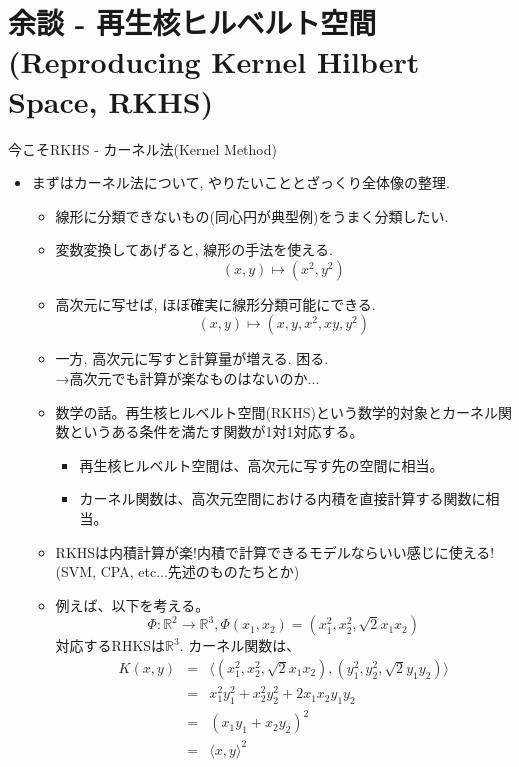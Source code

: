 \documentclass[dvipdfmx,8pt]{beamer}
\begin{document}
  \section{余談 - 再生核ヒルベルト空間\\(Reproducing Kernel Hilbert Space, RKHS)}
  \begin{frame}{今こそRKHS - カーネル法(Kernel Method)}
    \begin{itemize}
      \item まずはカーネル法について, やりたいこととざっくり全体像の整理. \\
        \begin{itemize}
          \item 線形に分類できないもの(同心円が典型例)をうまく分類したい.
          \item 変数変換してあげると, 線形の手法を使える. \\
            \[
              (x,y) \mapsto (x^2,y^2)
            \]
          \item 高次元に写せば, ほぼ確実に線形分類可能にできる.
            \[
              (x,y)\mapsto (x,y,x^2,xy,y^2)
            \]
          \item 一方, 高次元に写すと計算量が増える. 困る. \\
            →高次元でも計算が楽なものはないのか...
          \item 数学の話。再生核ヒルベルト空間(RKHS)という数学的対象とカーネル関数というある条件を満たす関数が1対1対応する。
            \begin{itemize}
              \item 再生核ヒルベルト空間は、高次元に写す先の空間に相当。
              \item カーネル関数は、高次元空間における内積を直接計算する関数に相当。
            \end{itemize}
          \item RKHSは内積計算が楽!内積で計算できるモデルならいい感じに使える!\\
            (SVM, CPA, etc...先述のものたちとか)
          \item 例えば、以下を考える。
            \[
              \Phi\colon \mathbb{R}^2\to\mathbb{R}^3, \Phi(x_1,x_2)=(x_1^2,x_2^2,\sqrt{2}x_1x_2)
            \]
            対応するRHKSは$\mathbb{R}^3$.
            カーネル関数は、
            \begin{eqnarray*}
              K(x,y)&=&\langle(x_1^2,x_2^2,\sqrt{2}x_1x_2),(y_1^2,y_2^2,\sqrt{2}y_1y_2)\rangle\\
              &=&x_1^2y_1^2+x_2^2y_2^2+2x_1x_2y_1y_2\\
              &=&(x_1y_1+x_2y_2)^2\\
              &=&\langle x,y\rangle^2
            \end{eqnarray*}
        \end{itemize}
    \end{itemize}
  \end{frame}
\end{document}
